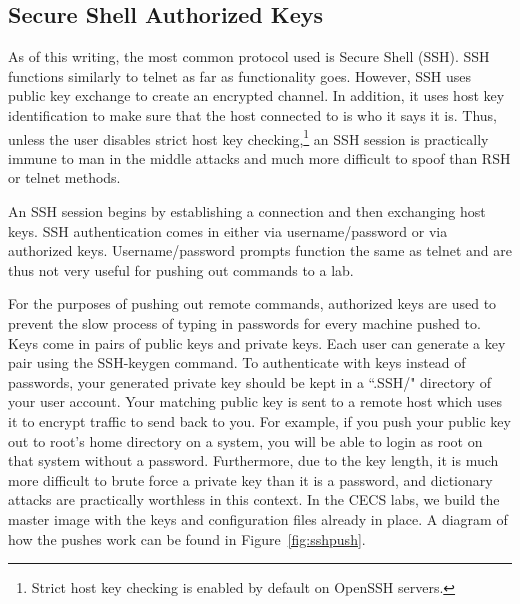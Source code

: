\subsection{Secure Shell Authorized Keys}
As of this writing, the most common protocol used is Secure Shell (SSH).  SSH functions similarly to telnet as far as functionality goes.  However, SSH uses public key exchange to create an encrypted channel.  In addition, it uses host key identification to make sure that the host connected to is who it says it is.  Thus, unless the user disables strict host key checking,\footnote{Strict host key checking is enabled by default on OpenSSH servers.} an SSH session is practically immune to man in the middle attacks and much more difficult to spoof than RSH or telnet methods.   

An SSH session begins by establishing a connection and then exchanging host keys.  SSH authentication comes in either via username/password or via authorized keys.  Username/password prompts function the same as telnet and are thus not very useful for pushing out commands to a lab.

For the purposes of pushing out remote commands, authorized keys are used to prevent the slow process of typing in passwords for every machine pushed to.  Keys come in pairs of public keys and private keys.  Each user can generate a key pair using the SSH-keygen command.  To authenticate with keys instead of passwords, your generated private key should be kept in a ``.SSH/" directory of your user account.  Your matching public key is sent to a remote host which uses it to encrypt traffic to send back to you.  For example, if you push your public key out to root's home directory on a system, you will be able to login as root on that system without a password.  Furthermore, due to the key length, it is much more difficult to brute force a private key than it is a password, and dictionary attacks are practically worthless in this context.  In the CECS labs, we build the master image with the keys and configuration files already in place.  A diagram of how the pushes work can be found in Figure~\ref{fig:sshpush}.

